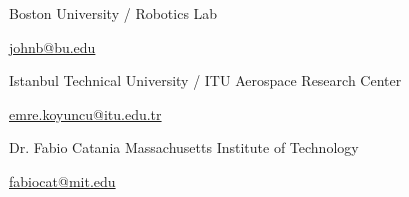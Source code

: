 
\begin{cvskills}

  \cvskill
    {} %
    {} %

  \cvskill
    {\href{https://www.bu.edu/eng/profile/john-baillieul-ph-d-me-se/}{}} %
    {Boston University / Robotics Lab} %

  \cvskill
    {} %
    {\href{mailto:johnb@bu.edu}{johnb@bu.edu}} %
    
  \cvskill
    {\href{https://arc.itu.edu.tr/aignca-research-group/}{}} %
    {Istanbul Technical University / ITU Aerospace Research Center} %

  \cvskill
    {} %
    {\href{mailto:emre.koyuncu@itu.edu.tr}{emre.koyuncu@itu.edu.tr}} %
    

  \cvskill
    {Dr. Fabio Catania} %
    {Massachusetts Institute of Technology} %

  \cvskill
    {} %
    {\href{mailto:fabiocat@mit.edu}{fabiocat@mit.edu}} %
\end{cvskills}
